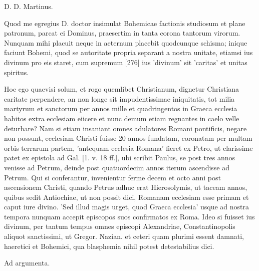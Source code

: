 D. D. Martinus.

Quod me egregius D. doctor insimulat Bohemicae factionis studiosum et plane patronum, parcat ei Dominus, praesertim in tanta corona tantorum virorum. Nunquam mihi placuit neque in aeternum placebit quodcunque schisma; inique faciunt Bohemi, quod se autoritate propria separant a nostra unitate, etiamsi ius divinum pro eis staret, cum supremum [276] ius 'divinum' sit 'caritas' et unitas spiritus.

Hoc ego quaevisi solum, et rogo quemlibet Christianum, dignetur Christiana caritate perpendere, an non longe sit impudentissimae iniquitatis, tot milia martyrum et sanctorum per annos mille et quadringentos in Graeca ecclesia habitos extra ecclesiam eiicere et nunc demum etiam regnantes in caelo velle deturbare? Nam si etiam insaniant omnes adulatores Romani pontificis, negare non possunt, ecclesiam Christi fuisse 20 annos fundatam, coronatam per multam orbis terrarum partem, 'antequam ecclesia Romana' fieret ex Petro, ut clarissime patet ex epistola ad Gal. [1. v. 18 ff.], ubi scribit Paulus, se post tres annos venisse ad Petrum, deinde post quatuordecim annos iterum ascendisse ad Petrum. Qui si conferantur, invenientur ferme decem et octo anni post ascensionem Christi, quando Petrus adhuc erat Hierosolymis, ut taceam annos, quibus sedit Antiochiae, ut non possit dici, Romanam ecclesiam esse primam et caput iure divino. 'Sed illud magis urget, quod Graeca ecclesia' usque ad nostra tempora nunquam accepit episcopos suos confirmatos ex Roma. Ideo si fuisset ius divinum, per tantum tempus omnes episcopi Alexandriae, Constantinopolis aliquot sanctissimi, ut Gregor. Nazian. et ceteri quam plurimi essent damnati, haeretici et Bohemici, qua blasphemia nihil potest detestabilius dici.

Ad argumenta.

